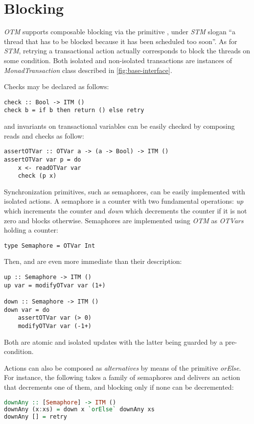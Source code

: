 \section{Blocking}
\emph{OTM} supports composable blocking via the primitive , 
under \emph{STM} slogan ``a thread that has to be blocked because it has 
been scheduled too soon''. As for \emph{STM}, retrying a transactional action 
actually corresponds to block the threads on some condition. Both isolated and non-isolated transactions are instances of \emph{MonadTransaction} class described in \cref{fig:base-interface}.

Checks may be declared as follows:
\begin{lstlisting}
check :: Bool -> ITM ()
check b = if b then return () else retry
\end{lstlisting}
and invariants on transactional variables can be easily checked by composing reads and checks as follow:
\begin{lstlisting}
assertOTVar :: OTVar a -> (a -> Bool) -> ITM ()
assertOTVar var p = do
    x <- readOTVar var
    check (p x)
\end{lstlisting}

Synchronization primitives, such as semaphores, can be easily implemented with isolated actions.
A semaphore is a counter with two fundamental operations: \emph{up} which increments the counter and \emph{down} which decrements the counter if it is not zero and blocks otherwise.
Semaphores are implemented using \emph{OTM} as \emph{OTVars} holding a counter:
\begin{lstlisting}
type Semaphore = OTVar Int
\end{lstlisting}
Then,  and  are even more immediate than their description:
\begin{lstlisting}
up :: Semaphore -> ITM ()
up var = modifyOTvar var (1+)

down :: Semaphore -> ITM ()
down var = do
    assertOTVar var (> 0)
    modifyOTVar var (-1+)
\end{lstlisting}
Both are atomic and isolated updates with the latter being guarded by a pre-condition.

Actions can also be composed as \emph{alternatives} by means of the primitive \emph{orElse}. For instance, the following takes a family of semaphores and delivers an action that decrements one of them, and blocking only if none can be decremented:
\begin{lstlisting}[language=haskell]
downAny :: [Semaphore] -> ITM ()
downAny (x:xs) = down x `orElse` downAny xs
downAny [] = retry
\end{lstlisting}

